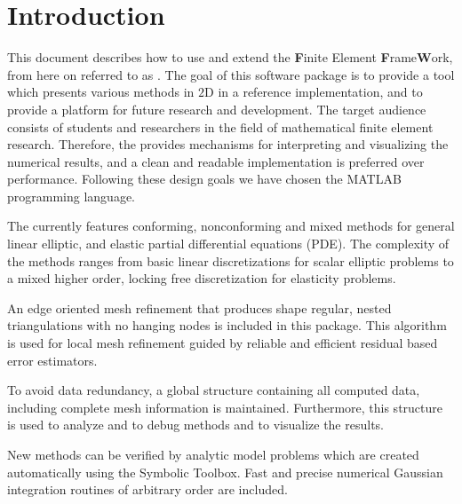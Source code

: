 \section{Introduction}

\noindent This document describes how to use and extend the \textbf{F}inite
Element \textbf{F}rame\textbf{W}ork, from here on referred to as
\FFW. The goal of this software package is to provide a tool which presents 
various methods in $2$D in a reference implementation, and to provide a platform for 
future research and development. The target audience consists of students and 
researchers in the field of mathematical finite element research. Therefore, 
the \FFW provides mechanisms for interpreting and visualizing the numerical results, 
and a clean and readable implementation is preferred over performance. Following 
these design goals we have chosen the MATLAB programming language. 

\bigskip

\noindent The \FFW currently features conforming, nonconforming and mixed methods for general 
linear elliptic, and elastic partial differential equations (PDE). The complexity
of the methods ranges from basic linear discretizations for scalar elliptic problems 
to a mixed higher order, locking free discretization for elasticity problems.

\bigskip

\noindent An edge oriented mesh refinement that produces shape regular, nested triangulations with 
no hanging nodes is included in this package. This algorithm is used for local mesh
refinement guided by reliable and efficient residual based error estimators.

\bigskip

\noindent To avoid data redundancy, a global structure containing all computed data, 
including complete mesh information is maintained. Furthermore, this structure 
is used to analyze and to debug methods and to visualize the results. 

\bigskip

\noindent New methods can be verified by analytic model problems which are created automatically using the 
Symbolic Toolbox. Fast and precise numerical Gaussian integration routines of arbitrary order
are included.

